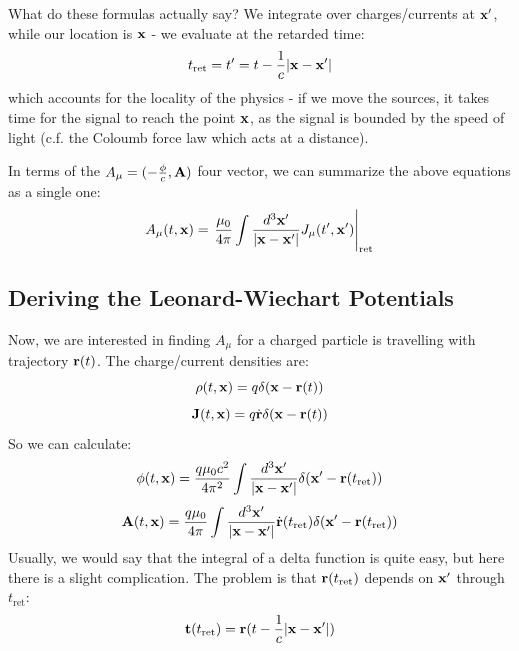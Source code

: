 What do these formulas actually say? We integrate over charges/currents at $\mathbf{x}'$, while our location is $\mathbf{x}$ - we evaluate at the retarded time:
\begin{equation}
    t_{\text{ret}} = t' =  t - \frac{1}{c}\lvert \mathbf{x} - \mathbf{x}' \rvert
\end{equation}
which accounts for the locality of the physics - if we move the sources, it takes time for the signal to reach the point $\mathbf{x}$, as the signal is bounded by the speed of light (c.f. the Coloumb force law which acts at a distance).

In terms of the $A_\mu = (-\frac{\phi}{c}, \mathbf{A})$ four vector, we can summarize the above equations as a single one:
\begin{equation}
    A_\mu(t, \mathbf{x}) = \left.\frac{\mu_0}{4\pi}\int \frac{d^3\mathbf{x}'}{\lvert \mathbf{x} - \mathbf{x}' \rvert}J_\mu(t', \mathbf{x}')\right|_{\text{ret}}
\end{equation}

\subsection{Deriving the Leonard-Wiechart Potentials}
Now, we are interested in finding $A_\mu$ for a charged particle is travelling with trajectory $\mathbf{r}(t)$. The charge/current densities are:
\begin{equation}
    \rho(t, \mathbf{x}) = q\delta(\mathbf{x} - \mathbf{r}(t))
\end{equation}
\begin{equation}
    \mathbf{J}(t, \mathbf{x}) = q\dot{\mathbf{r}}\delta(\mathbf{x} - \mathbf{r}(t))
\end{equation}
So we can calculate:
\begin{equation}
    \phi(t, \mathbf{x}) = \frac{q\mu_0 c^2}{4\pi^2}\int \frac{d^3\mathbf{x}'}{\lvert \mathbf{x} - \mathbf{x}' \rvert}\delta(\mathbf{x}' - \mathbf{r}(t_{\text{ret}}))
\end{equation}
\begin{equation}
    \mathbf{A}(t, \mathbf{x}) = \frac{q\mu_0}{4\pi}\int \frac{d^3\mathbf{x}'}{\lvert \mathbf{x} - \mathbf{x}' \rvert}\dot{\mathbf{r}}(t_{\text{ret}})\delta(\mathbf{x}' - \mathbf{r}(t_{\text{ret}}))
\end{equation}
Usually, we would say that the integral of a delta function is quite easy, but here there is a slight complication. The problem is that $\mathbf{r}(t_{\text{ret}})$ depends on $\mathbf{x}'$ through $t_{\text{ret}}$:
\begin{equation}
    \mathbf{t}(t_{\text{ret}}) = \mathbf{r}(t - \frac{1}{c}\lvert \mathbf{x} - \mathbf{x}' \rvert)
\end{equation}


